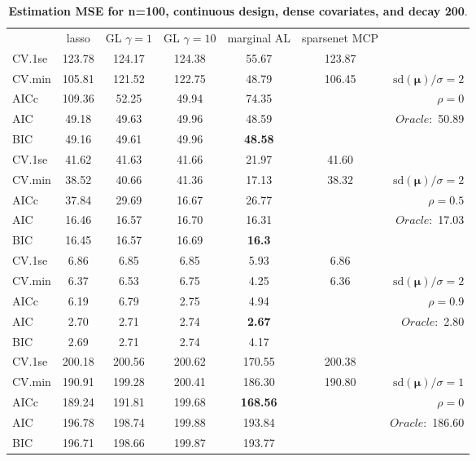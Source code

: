 \begin{table}\vspace{-.5cm}
\caption[l]{ { \bf Estimation MSE for n=100, continuous design, 
dense covariates, and  decay  200}.}
\vspace{-.5cm}
\footnotesize{}
\begin{center}
\begin{tabular}{l*{5}{c}|r}
& lasso & GL $\gamma=1$ & GL $\gamma=10$ & marginal AL & sparsenet MCP  & \\
 \cline{1-7}
CV.1se & 123.78 & 124.17 & 124.38 & 55.67 & 123.87 & \\
CV.min & 105.81 & 121.52 & 122.75 & 48.79 & 106.45 &  $\mathrm{sd}(\mathbf{\mu})/\sigma=2$ \\
AICc & 109.36 & 52.25 & 49.94 & 74.35 & & $\rho=0$ \\
AIC & 49.18 & 49.63 & 49.96 & 48.59 & &  \multirow{2}{*}{$Oracle: $ 50.89} \\
BIC & 49.16 & 49.61 & 49.96 & {\bf 48.58} & &  \\
 \hline 
CV.1se & 41.62 & 41.63 & 41.66 & 21.97 & 41.60 & \\
CV.min & 38.52 & 40.66 & 41.36 & 17.13 & 38.32 &  $\mathrm{sd}(\mathbf{\mu})/\sigma=2$ \\
AICc & 37.84 & 29.69 & 16.67 & 26.77 & & $\rho=0.5$ \\
AIC & 16.46 & 16.57 & 16.70 & 16.31 & &  \multirow{2}{*}{$Oracle: $ 17.03} \\
BIC & 16.45 & 16.57 & 16.69 & {\bf 16.3} & &  \\
 \hline 
CV.1se & 6.86 & 6.85 & 6.85 & 5.93 & 6.86 & \\
CV.min & 6.37 & 6.53 & 6.75 & 4.25 & 6.36 &  $\mathrm{sd}(\mathbf{\mu})/\sigma=2$ \\
AICc & 6.19 & 6.79 & 2.75 & 4.94 & & $\rho=0.9$ \\
AIC & 2.70 & 2.71 & 2.74 & {\bf 2.67} & &  \multirow{2}{*}{$Oracle: $ 2.80} \\
BIC & 2.69 & 2.71 & 2.74 & 4.17 & &  \\
 \hline 
CV.1se & 200.18 & 200.56 & 200.62 & 170.55 & 200.38 & \\
CV.min & 190.91 & 199.28 & 200.41 & 186.30 & 190.80 &  $\mathrm{sd}(\mathbf{\mu})/\sigma=1$ \\
AICc & 189.24 & 191.81 & 199.68 & {\bf 168.56} & & $\rho=0$ \\
AIC & 196.78 & 198.74 & 199.88 & 193.84 & &  \multirow{2}{*}{$Oracle: $ 186.60} \\
BIC & 196.71 & 198.66 & 199.87 & 193.77 & &  \\

\end{tabular}
\end{center}
\end{table}
